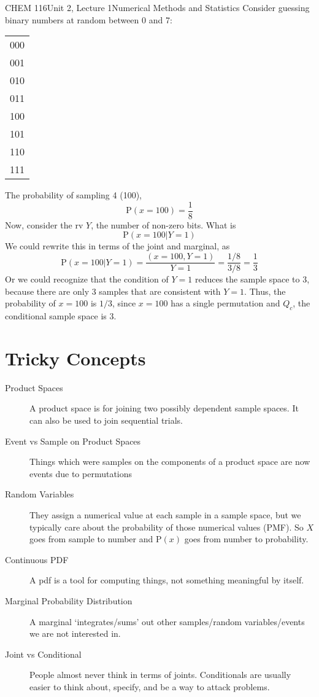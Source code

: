 \documentclass{article}
\renewcommand{\Pr}{\textrm{P}}
\begin{document}
\begin{tdoc}{CHEM 116}{Unit 2, Lecture 1}{Numerical Methods and Statistics}
Consider guessing binary numbers at random between 0 and 7:\vspace{0.25cm}

\begin{tabular}{l}
000\\
001\\
010\\
011\\
100\\
101\\
110\\
111\\
\end{tabular}\vspace{0.25cm}

The probability of sampling 4 (100), 
\[
\Pr(x = 100) = \frac{1}{8}
\] 
Now, consider the rv $Y$, the number of non-zero bits. What is
\[
\Pr(x = 100 | Y = 1)
\]
We could rewrite this in terms of the joint and marginal, as 
\[
\Pr(x = 100 | Y = 1) = \frac{(x = 100, Y = 1)}{Y = 1} = \frac{1 / 8}{3 / 8} = \frac{1}{3}
\]
Or we could recognize that the condition of $Y = 1$ reduces the sample
space to 3, because there are only 3 samples that are consistent with
$Y = 1$. Thus, the probability of $x = 100$ is $1/3$, since $x = 100$
has a single permutation and $Q_c$, the conditional sample space is
$3$.

\section{Tricky Concepts}

\begin{description}

\item[Product Spaces] A product space is for joining two possibly
  dependent sample spaces. It can also be used to join sequential trials.

\item[Event vs Sample on Product Spaces] Things which were samples on
  the components of a product space are now events due to permutations

\item[Random Variables] They assign a numerical value at each sample
  in a sample space, but we typically care about the probability of
  those numerical values (PMF). So $X$ goes from sample to number and
  $\Pr(x)$ goes from number to probability.

\item[Continuous PDF] A pdf is a tool for computing things, not
  something meaningful by itself.

\item[Marginal Probability Distribution] A marginal `integrates/sums'
  out other samples/random variables/events we are not interested in.

\item[Joint vs Conditional] People almost never think in terms of
  joints. Conditionals are usually easier to think about, specify, and
  be a way to attack problems. 

\end{description}

\end{tdoc}
\end{document}
